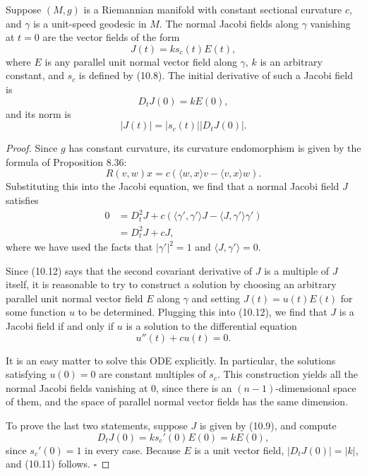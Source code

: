 \begin{proposition}\label{prop:jacobi-constant-curvature}
Suppose $(M, g)$ is a Riemannian manifold with constant sectional curvature $c$, and $\gamma$ is a unit-speed geodesic in $M$. The normal Jacobi fields along $\gamma$ vanishing at $t = 0$ are the vector fields of the form
\begin{equation}
J(t) = k s_c(t) E(t), \tag{10.9}
\end{equation}
where $E$ is any parallel unit normal vector field along $\gamma$, $k$ is an arbitrary constant, and $s_c$ is defined by (10.8). The initial derivative of such a Jacobi field is
\begin{equation}
D_t J(0) = kE(0),
\tag{10.10}
\end{equation}
and its norm is
\begin{equation}
|J(t)| = |s_c(t)| |D_t J(0)|.
\tag{10.11}
\end{equation}
\end{proposition}

\begin{proof}
Since $g$ has constant curvature, its curvature endomorphism is given by the formula of Proposition 8.36:
\[
R(v,w)x = c(\langle w, x \rangle v - \langle v, x \rangle w).
\]
Substituting this into the Jacobi equation, we find that a normal Jacobi field $J$ satisfies
\begin{equation}
\begin{aligned}
0 &= D_t^2 J + c(\langle \gamma', \gamma' \rangle J - \langle J, \gamma' \rangle \gamma') \\
&= D_t^2 J + c J,
\end{aligned}
\tag{10.12}
\end{equation}
where we have used the facts that $|\gamma'|^2 = 1$ and $\langle J, \gamma' \rangle = 0$.

Since (10.12) says that the second covariant derivative of $J$ is a multiple of $J$ itself, it is reasonable to try to construct a solution by choosing an arbitrary parallel unit normal vector field $E$ along $\gamma$ and setting $J(t) = u(t)E(t)$ for some function $u$ to be determined. Plugging this into (10.12), we find that $J$ is a Jacobi field if and only if $u$ is a solution to the differential equation
\[
u''(t) + cu(t) = 0.
\]

It is an easy matter to solve this ODE explicitly. In particular, the solutions satisfying $u(0) = 0$ are constant multiples of $s_c$. This construction yields all the normal Jacobi fields vanishing at 0, since there is an $(n-1)$-dimensional space of them, and the space of parallel normal vector fields has the same dimension.

To prove the last two statements, suppose $J$ is given by (10.9), and compute
\[
D_t J(0) = k s_c'(0) E(0) = k E(0),
\]
since $s_c'(0) = 1$ in every case. Because $E$ is a unit vector field, $|D_t J(0)| = |k|$, and (10.11) follows. \quad$\square$
\end{proof}

